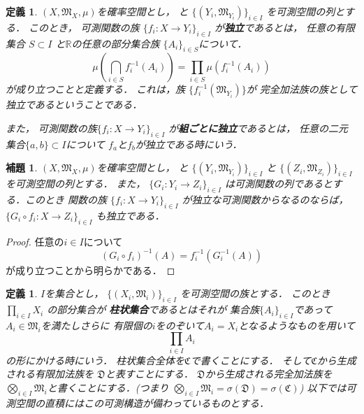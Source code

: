 \documentclass[leqno, a4paper, 12pt]{jsarticle}
\newtheorem{lem}[thm]{補題}
\newtheorem{df}[thm]{定義}
\newcommand{\rr}{\mathbb{R}}
\begin{document}
\begin{df}
$(X, \mathfrak{M}_X, \mu)$を確率空間とし，
と
$\{(Y_i, \mathfrak{M}_{Y_i})\}_{i\in I}$
を可測空間の列とする．
このとき，
可測関数の族
$\{f_i: X\to Y_i\}_{i\in I}$
が\textbf{独立}であるとは，
任意の有限集合
$S\subset I$
と$\rr$の任意の部分集合族
$\{A_i\}_{i\in S}$について．
\[
\mu\left(\bigcap_{i\in S}f_i^{-1}(A_i)\right)=
\prod_{i\in S}\mu\left(f_{i}^{-1}(A_i)\right)
\]
が成り立つことと定義する．
これは，族
$\{f_{i}^{-1}(\mathfrak{M}_{Y_{i}})\}$が
完全加法族の族として
独立であるということである．


また，
可測関数の族$\{f_i: X\to Y_i\}_{i\in I}$
が\textbf{組ごとに独立}であるとは，
任意の二元集合$\{a, b\}\subset I$について
$f_a$と$f_b$が独立である時にいう．
\end{df}

\begin{lem}\label{lem:gousei}
$(X, \mathfrak{M}_X, \mu)$を確率空間とし，
と
$\{(Y_i, \mathfrak{M}_{Y_i})\}_{i\in I}$
と
$\{(Z_i, \mathfrak{M}_{Z_i})\}_{i\in I}$
を可測空間の列とする．
また，
$\{G_i: Y_i\to Z_i\}_{i\in I}$
は可測関数の列であるとする．このとき
関数の族
$\{f_i: X\to Y_i\}_{i\in I}$
が独立な可測関数からなるのならば，
$\{G_i\circ f_i: X\to Z_i\}_{i\in I}$
も独立である．
\end{lem}
\begin{proof}
任意の$i\in I$について
\[
(G_i\circ f_i)^{-1}(A)=f_i^{-1}(G_i^{-1}(A))
\]
が成り立つことから明らかである．
\end{proof}


\begin{df}
$I$を集合とし，
$\{(X_{i}, \mathfrak{M}_{i})\}_{i\in I}$
を可測空間の族とする．
このとき$\prod_{i\in I}X_{i}$
の部分集合が
\textbf{柱状集合}であるとはそれが
集合族$\{A_{i}\}_{i\in I}$であって
$A_{i}\in \mathfrak{M}_{i}$を満たしさらに
有限個の$i$をのぞいて$A_{i}=X_{i}$となるようなものを用いて
\[
\prod_{i\in I}A_{i}
\]
の形にかける時にいう．
柱状集合全体を$\mathfrak{C}$で書くことにする．
そして$\mathfrak{C}$から生成される有限加法族を
$\mathfrak{D}$と表すことにする．
$\mathfrak{D}$から生成される完全加法族を
$\bigotimes_{i\in I}\mathfrak{M}_{i}$と書くことにする．(つまり
$\bigotimes_{i\in I}\mathfrak{M}_{i}=\sigma(\mathfrak{D})=\sigma(\mathfrak{C})$)
以下では可測空間の直積にはこの可測構造が備わっているものとする．
\end{df}
\end{document}
